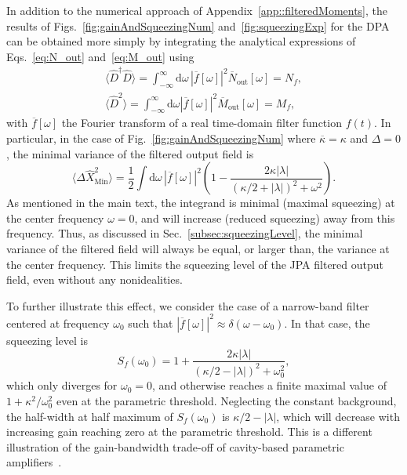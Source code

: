 \documentclass[pra,twocolumn,superscriptaddress]{revtex4-1}
\newcommand{\kappaTot}[0]{\overline{\kappa}}
\newcommand{\parO}[1]{\left(#1\right)}
\newcommand{\abs}[1]{\left|#1\right|}
\newcommand{\drm}[0]{\mathrm{d}}
\begin{document}
In addition to the numerical approach of Appendix~\ref{app::filteredMoments}, the results of Figs.~\ref{fig:gainAndSqueezingNum} and~\ref{fig:squeezingExp} for the DPA can be obtained more simply by integrating the analytical expressions of Eqs.~\eqref{eq:N_out} and~\eqref{eq:M_out} using 
\begin{align}
	\langle \hat D^\dag  \hat D \rangle  = \int_{-\infty}^\infty\!\! \drm \omega \, \abs{\overline{f}[\omega]}^2 \overline{N}_{\mathrm{out}}[\omega] = N_f,
	\\
	 \langle \hat D^2 \rangle   = \int_{-\infty}^\infty\!\! \drm \omega  \abs{\overline{f}[\omega]}^2 \overline{M}_{\mathrm{out}}[\omega] = M_f,
\end{align}
with $\overline{f}[\omega]$ the Fourier transform of a real time-domain filter function $f(t)$.
In particular, in the case of Fig.~\ref{fig:gainAndSqueezingNum} where $\kappaTot = \kappa$ and $\Delta=0$, the minimal variance of the filtered output field is
\begin{equation}
	 \langle \Delta \hat X^2_{\mathrm{Min} }  \rangle 
	 = 
	\frac{ 1 }{2}
	\int
	\drm \omega \, \abs{\overline{f}[\omega]}^2
	 	  \parO{ 1 - \frac{ 2 \kappa \abs{\lambda} }{ \parO{ \kappa/2 + \abs{\lambda}  }^2 + \omega^2} }.
\end{equation}
As mentioned in the main text, the integrand is minimal (maximal squeezing) at the center frequency $\omega=0$, and will increase (reduced squeezing) away from this frequency. Thus, as discussed in Sec.~\ref{subsec:squeezingLevel}, the minimal variance of the filtered field will always be equal, or larger than, the variance at the center frequency. This limits the squeezing level of the JPA filtered output field, even without any nonidealities. 

To further illustrate this effect, we consider the case of a narrow-band filter centered at frequency $\omega_0$ such that $\abs{\overline{f}[\omega]}^2 \approx \delta(\omega-\omega_0)$. In that case, the squeezing level is 
\begin{equation}
	S_f(\omega_0) = 1+ \frac{ 2 \kappa \abs{\lambda} }{ \parO{ \kappa/2 - \abs{\lambda}  }^2 +\omega_0^2},
	\label{eq:sfw0}
\end{equation}
which only diverges for $\omega_0=0$, and otherwise reaches a finite maximal value of $1+ \kappa^2/\omega_0^2$ even at the parametric threshold. Neglecting the constant background, the half-width at half maximum of $S_f(\omega_0)$ is $\kappa/2-\abs{\lambda}$, which will decrease with increasing gain reaching zero at the parametric threshold. This is a different illustration of the gain-bandwidth trade-off of cavity-based parametric amplifiers~\cite{Clerk:2010dq}.


% 

\end{document}
